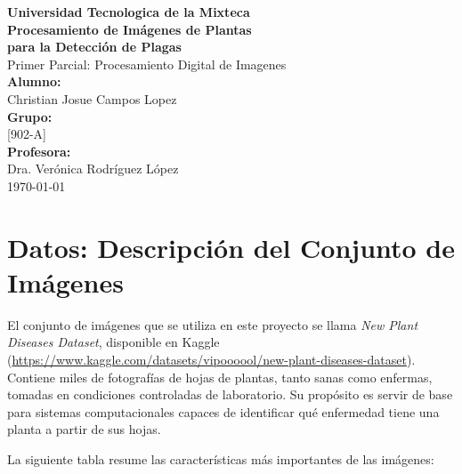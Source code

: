 \documentclass[11pt,a4paper]{article}
\begin{document}
\begin{titlepage}
    \centering
    \vspace*{2cm}

    {\Huge \textbf{Universidad Tecnologica de la Mixteca}}\\[2cm]

    {\huge \textbf{Procesamiento de Imágenes de Plantas \\ para la Detección de Plagas}}\\[1.5cm]

    {\Large Primer Parcial: Procesamiento Digital de Imagenes}\\[2.5cm]

    {\large \textbf{Alumno:}}\\
    {\Large Christian Josue Campos Lopez}\\[0.5cm]

    {\large \textbf{Grupo:}}\\
    {\Large [902-A]}\\[2cm]

    {\large \textbf{Profesora:}}\\
    {\Large Dra. Verónica Rodríguez López}\\[2cm]

    \vfill
    {\large \today}
\end{titlepage}

\newpage

\section{Datos: Descripción del Conjunto de Imágenes}

El conjunto de imágenes que se utiliza en este proyecto se llama \textit{New Plant Diseases Dataset},
disponible en Kaggle (\url{https://www.kaggle.com/datasets/vipoooool/new-plant-diseases-dataset}).
Contiene miles de fotografías de hojas de plantas, tanto sanas como enfermas,
tomadas en condiciones controladas de laboratorio. Su propósito es servir de base para
sistemas computacionales capaces de identificar qué enfermedad tiene una planta a partir
de sus hojas.

La siguiente tabla resume las características más importantes de las imágenes:
\end{document}
